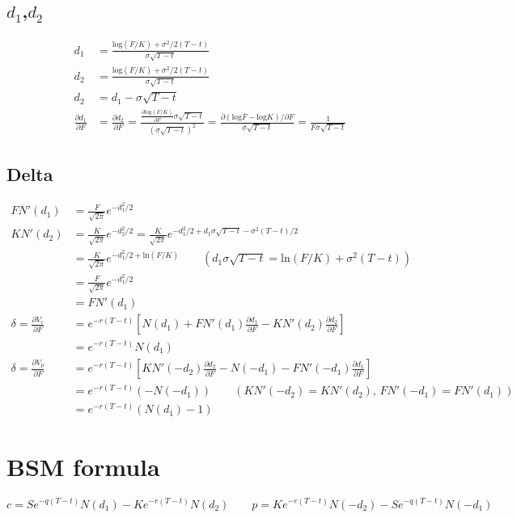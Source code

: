 \documentclass[11pt]{article}
\begin{document}
\subsection{$d_1$,$d_2$}
\begin{align*}
    d_1 &= \frac{\text{log}(F/K) + \sigma^2/2(T-t)}{\sigma \sqrt{T-t}} \\
    d_2 &= \frac{\text{log}(F/K) + \sigma^2/2(T-t)}{\sigma \sqrt{T-t}} \\
    d_2 &= d_1 - \sigma \sqrt{T-t} \\
    \frac{\partial d_1}{\partial F} &= \frac{\partial d_2}{\partial F} = \frac{\frac{\partial \text{log}(F/K)}{\partial F} \sigma \sqrt{T-t}}{(\sigma \sqrt{T-t})^2} = \frac{\partial (\text{log} F - \text{log} K)/\partial F}{\sigma\sqrt{T-t}} = \frac{1}{F\sigma\sqrt{T-t}}
\end{align*}

\subsection{Delta}
\begin{align*}
    FN'(d_1) &= \frac{F}{\sqrt{2\pi}}e^{-d_1^2/2} \\
    KN'(d_2) &= \frac{K}{\sqrt{2\pi}}e^{-d_2^2/2} = \frac{K}{\sqrt{2\pi}}e^{-d_1^2/2+d_1\sigma\sqrt{T-t}-\sigma^2(T-t)/2} \\
    &= \frac{K}{\sqrt{2\pi}}e^{-d_1^2/2+\text{ln}(F/K)} 
    \qquad \left(d_1\sigma\sqrt{T-t} = \text{ln}(F/K)+\sigma^2(T-t)\right) \\
    &= \frac{F}{\sqrt{2\pi}}e^{-d_1^2/2} \\
    &= FN'(d_1) \\
    \delta = \frac{\partial V_c}{\partial F} &= e^{-r(T-t)}[N(d_1) + FN'(d_1)\frac{\partial d_1}{\partial F} - KN'(d_2)\frac{\partial d_2}{\partial F}] \\
    &= e^{-r(T-t)}N(d_1) \\
    \delta = \frac{\partial V_p}{\partial F} &= e^{-r(T-t)}[KN'(-d_2)\frac{\partial d_2}{\partial F} - N(-d_1) - FN'(-d_1)\frac{\partial d_1}{\partial F}] \\
    &= e^{-r(T-t)}(-N(-d_1)) \qquad \left(KN'(-d_2) = KN'(d_2),\, FN'(-d_1)= FN'(d_1)\right) \\
    &= e^{-r(T-t)}(N(d_1)-1)
\end{align*}

\section{BSM formula}
\begin{equation*}
    c = Se^{-q(T-t)}N(d_1) - Ke^{-r(T-t)}N(d_2) \qquad
    p = Ke^{-r(T-t)}N(-d_2) - Se^{-q(T-t)}N(-d_1)
\end{equation*}
\end{document}
